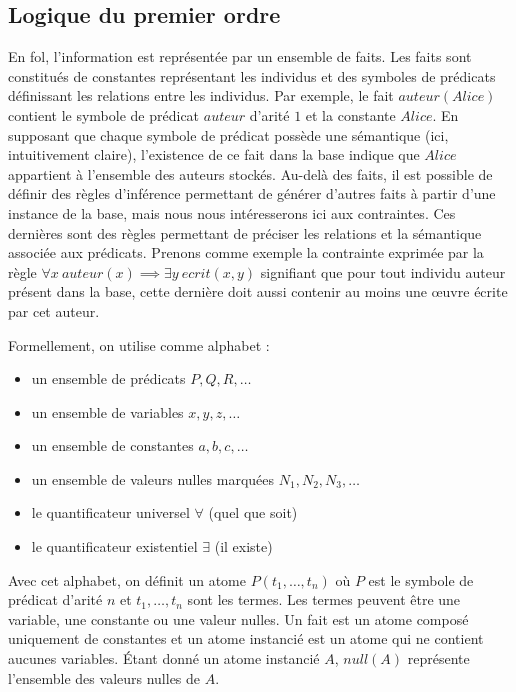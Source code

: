 \subsection{Logique du premier ordre}
\label{sec:update:pre:logic}

En \gls{fol}, l'information est représentée par un ensemble de faits.
Les faits sont constitués de constantes représentant les individus et des symboles de prédicats définissant les relations entre les individus.
Par exemple, le fait $auteur(Alice)$ contient le symbole de prédicat $auteur$ d'arité $1$ et la constante $Alice$.
En supposant que chaque symbole de prédicat possède une sémantique (ici, intuitivement claire), l'existence de ce fait dans la base indique que $Alice$ appartient à l'ensemble des auteurs stockés.
Au-delà des faits, il est possible de définir des règles d'inférence permettant de générer d'autres faits à partir d'une instance de la base, mais nous nous intéresserons ici aux contraintes.
Ces dernières sont des règles permettant de préciser les relations et la sémantique associée aux prédicats.
Prenons comme exemple la contrainte exprimée par la règle $\forall x~auteur(x) \implies \exists y~ecrit(x,y)$ signifiant que pour tout individu auteur présent dans la base, cette dernière doit aussi contenir au moins une œuvre écrite par cet auteur.

Formellement, on utilise comme alphabet :
\begin{itemize}
    \item un ensemble de prédicats $P, Q, R, \dots$
    \item un ensemble de variables $x, y, z, \dots$
    \item un ensemble de constantes $a, b, c, \dots$
    \item un ensemble de valeurs nulles marquées $N_1, N_2, N_3, \dots$
    \item le quantificateur universel $\forall$ (quel que soit)
    \item le quantificateur existentiel $\exists$ (il existe)
\end{itemize}
Avec cet alphabet, on définit un atome $P(t_1, \dots, t_n)$ où $P$ est le symbole de prédicat d'arité $n$ et $t_1, \dots, t_n$ sont les termes.
Les termes peuvent être une variable, une constante ou une valeur nulles.
Un fait est un atome composé uniquement de constantes et un atome instancié est un atome qui ne contient aucunes variables.
Étant donné un atome instancié $A$, $null(A)$ représente l'ensemble des valeurs nulles de $A$.

